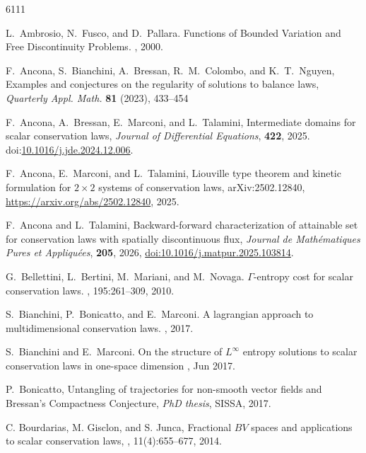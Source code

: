 \documentclass[11pt, twoside, reqno]{amsart}
\theoremstyle{definition}
\theoremstyle{remark}
\numberwithin{equation}{section}
\begin{document}
\begin{thebibliography}{6111}

L.~Ambrosio, N.~Fusco, and D.~Pallara.
\newblock  Functions of Bounded Variation and Free Discontinuity Problems.
, 2000.


 F.~Ancona, S.~Bianchini, A.~Bressan,
R.~M.~Colombo, and K.~T.~Nguyen, 
Examples and conjectures on the regularity
of solutions to balance laws, {\em Quarterly Appl. Math.} {\bf 81}
(2023), 433--454


F.~Ancona, A.~Bressan, E.~Marconi, and L.~Talamini,
 Intermediate domains for scalar conservation laws,
{\em Journal of Differential Equations}, {\bf 422}, 2025.
doi:\href{https://doi.org/10.1016/j.jde.2024.12.006}{10.1016/j.jde.2024.12.006}.




F.~Ancona, E.~Marconi, and L.~Talamini,
Liouville type theorem and kinetic formulation for $2\times 2$ systems of conservation laws, 
arXiv:2502.12840, \href{https://arxiv.org/abs/2502.12840}{https://arxiv.org/abs/2502.12840}, 2025.

F.~Ancona and L.~Talamini,
Backward-forward characterization of attainable set for conservation laws with spatially discontinuous flux,
{\em Journal de Mathématiques Pures et Appliquées},
{\bf 205}, 2026, 
\href{https://doi.org/10.1016/j.matpur.2025.103814}{doi:10.1016/j.matpur.2025.103814}.


G.~Bellettini, L.~Bertini, M.~Mariani, and M.~Novaga.
\newblock $\Gamma$-entropy cost for scalar conservation laws.
, 195:261--309, 2010.


S.~Bianchini, P.~Bonicatto, and E.~Marconi.
\newblock A lagrangian approach to multidimensional conservation laws.
, 2017.


S.~Bianchini and E.~Marconi.
\newblock On the structure of $L^\infty$ entropy solutions to scalar
  conservation laws in one-space dimension
, Jun 2017.

P.~Bonicatto,
Untangling of trajectories for non-smooth vector fields and Bressan's Compactness Conjecture,
\emph{PhD thesis}, SISSA, 2017.

C. Bourdarias, M. Gisclon, and S. Junca, 
\newblock Fractional {$BV$} spaces and applications to scalar conservation laws,
, 11(4):655--677, 2014.



\end{thebibliography}
\end{document}
